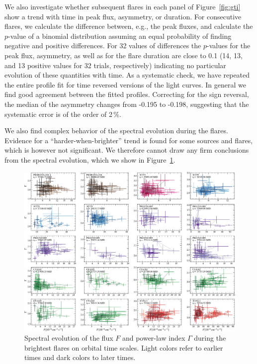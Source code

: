 \documentclass[twocolumn]{aastex62}
\begin{document}
We also investigate whether subsequent flares in each panel of Figure~\ref{fig:gti} show a trend with time in peak flux, asymmetry, or duration. 
For consecutive flares, we calculate the difference between, e.g., the peak fluxes, and calculate the $p$-value of a binomial distribution assuming an equal probability of finding negative and positive differences.
For 32 values of differences the $p$-values for the peak flux, asymmetry, as well as for the flare duration are close to 0.1 (14, 13, and 13 positive values for 32 trials, respectively) indicating no particular evolution of these quantities with time. 
As a systematic check, we have repeated the entire profile fit for time reversed versions of the light curves. In general we find good agreement between the fitted profiles. Correcting for the sign reversal, the median of the asymmetry changes from -0.195 to -0.198, suggesting that the systematic error is of the order of 2\,\%. 

We also find complex behavior of the spectral evolution during the flares. Evidence for a  ``harder-when-brighter'' trend is found for some sources and flares, which is however not significant. 
We therefore cannot draw any firm conclusions from the spectral evolution, which we show 
in Figure~\ref{fig:specvar}. 

\begin{figure}
    \centering
    \includegraphics[width = .9 \linewidth]{lc_specvar_flare_int.pdf}
    \caption{Spectral evolution of the flux $F$ and power-law index $\Gamma$ during the brightest flares on orbital time scales. Light colors refer to earlier times and dark colors to later times.}
    \label{fig:specvar}
\end{figure}
\end{document}
